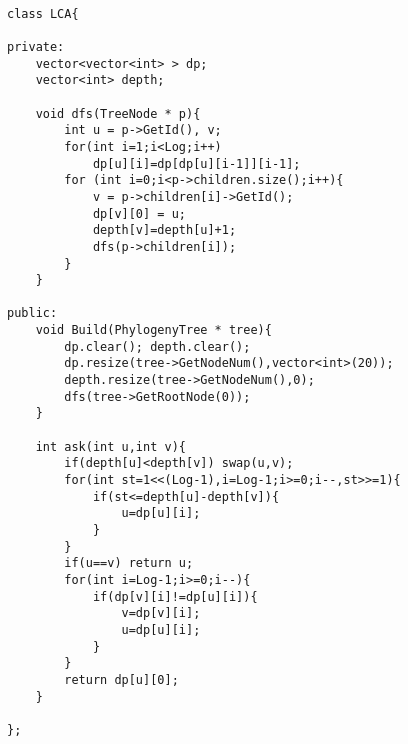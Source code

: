 \begin{CJK}{UTF8}{gbsn}
\begin{lstlisting}

class LCA{
    
private:
    vector<vector<int> > dp;
    vector<int> depth;
    
    void dfs(TreeNode * p){
        int u = p->GetId(), v;
        for(int i=1;i<Log;i++)
            dp[u][i]=dp[dp[u][i-1]][i-1];
        for (int i=0;i<p->children.size();i++){
            v = p->children[i]->GetId();
            dp[v][0] = u;
            depth[v]=depth[u]+1;
            dfs(p->children[i]);
        }
    }
    
public:
    void Build(PhylogenyTree * tree){
        dp.clear(); depth.clear();
        dp.resize(tree->GetNodeNum(),vector<int>(20));
        depth.resize(tree->GetNodeNum(),0);
        dfs(tree->GetRootNode(0));
    }
    
    int ask(int u,int v){
        if(depth[u]<depth[v]) swap(u,v);
        for(int st=1<<(Log-1),i=Log-1;i>=0;i--,st>>=1){
            if(st<=depth[u]-depth[v]){
                u=dp[u][i];
            }
        }
        if(u==v) return u;
        for(int i=Log-1;i>=0;i--){
            if(dp[v][i]!=dp[u][i]){
                v=dp[v][i];
                u=dp[u][i];
            }
        }
        return dp[u][0];
    }

};
\end{lstlisting}
\end{CJK}
